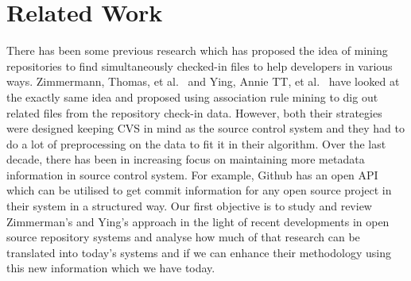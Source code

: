 
\section{Related Work}
\label{sec:related}

There has been some previous research which has proposed the idea of mining repositories to find simultaneously checked-in files to help developers in various ways. Zimmermann, Thomas, et al.~\cite{zimmermann2005mining} and Ying, Annie TT, et al.~\cite{ying2004predicting} have looked at the exactly same idea and proposed using association rule mining to dig out related files from the repository check-in data. However, both their strategies were designed keeping CVS in mind as the source control system and they had to do a lot of preprocessing on the data to fit it in their algorithm. Over the last decade, there has been in increasing focus on maintaining more metadata information in source control system. For example, Github has an open API which can be utilised to get commit information for any open source project in their system in a structured way. Our first objective is to study and review Zimmerman's and Ying's approach in the light of recent developments in open source repository systems and analyse how much of that research can be translated into today's systems and if we can enhance their methodology using this new information which we have today.